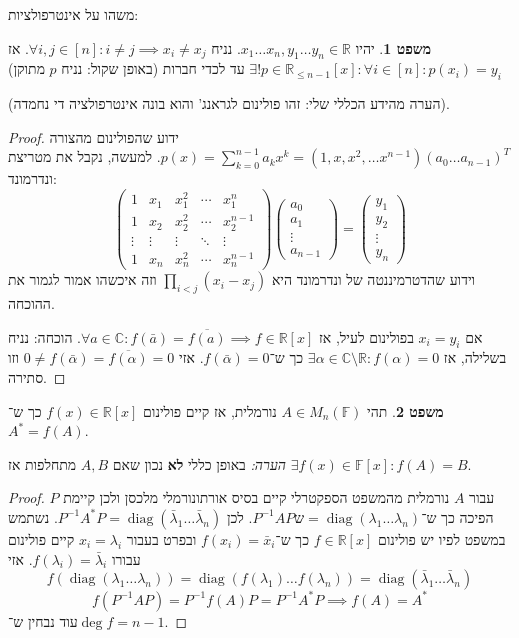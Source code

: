 \documentclass[a4paper]{article}
\newcommand\R     {\mathbb{R}}
\newcommand\C     {\mathbb{C}}
\newcommand\ol    {\overline}
\DeclareMathOperator{\diag}    {diag}
\newcommand\F         {\mathbb{F}}
\newcommand\co        {\colon}
\newcommand\pms[1]    {\begin{pmatrix}
		#1
\end{pmatrix}}
\newcommand\ag        {\alpha}
\renewcommand\lg      {\lambda}
\newcommand\op    {^{-1}}
\theoremstyle{definition}
\newtheorem{Theorem}{משפט}
\newcommand\theo  [1] {\begin{Theorem}#1\end{Theorem}}
\begin{document}
	משהו על אינטרפולציות: 
	\theo{יהיו $x_1 \dots x_n, y_1 \dots y_n \in \R$. נניח $\forall i, j \in [n] \co i \neq j \implies x_i \neq x_j$. אז $\exists! p \in \R_{\le n - 1}[x] \co \forall i \in [n] \co p(x_i) = y_i$ עד לכדי חברות (באופן שקול: נניח $p$ מתוקן) }
	(הערה מהידע הכללי שלי: זהו פולינום לגראנג' והוא בונה אינטרפולציה די נחמדה). \begin{proof}
		ידוע שהפולינום מהצורה $p(x)  = \sum_{k = 0}^{n - 1} a_k x^k  = (1, x, x^2, \dots x^{n - 1}) (a_0 \dots a_{n - 1})^T$. למעשה, נקבל את מטריצת ונדרמונד: 
		\[ \pms{1 & x_1 & x_1^2 & \cdots & x_1^n \\ 1 & x_2 & x_2^2 & \cdots & x_2^{n - 1} \\ \vdots & \vdots & \vdots & \ddots & \vdots \\ 1 & x_n & x_n^2 & \cdots & x_n^{n - 1}}\pms{a_0 \\ a_1 \\ \vdots \\ a_{n - 1}} = \pms{y_1 \\ y_2 \\ \vdots \\ y_n} \]
		וידוע שהדטרמיננטה של ונדרמונד היא $\prod_{i < j} (x_i - x_j)$ וזה איכשהו אמור לגמור את ההוכחה. 
		
		אם $x_i = y_i$ בפולינום לעיל, אז $\forall a \in \C \co f(\bar a) = \ol{f(a)} \implies f \in \R[x]$. הוכחה: נניח בשלילה, אז $\exists \ag \in \C\setminus \R \co f(\ag) = 0$ כך ש־$f(\bar \ag) = 0$. אזי $0 \neq f(\bar \ag) = \ol{f(\ag)}  = 0$ וזו סתירה. 
	\end{proof}
	
	\theo{תהי $A \in M_n(\F)$ נורמלית, אז קיים פולינום $f(x) \in \R[x]$ כך ש־$A^* = f(A)$. }
	\textit{הערה: }באופן כללי \textbf{לא} נכון שאם $A, B$ מתחלפות אז $\exists f(x) \in \F[x] \co f(A) = B$. 
	\begin{proof}
		עבור $A$ נורמלית מהמשפט הספקטרלי קיים בסיס אורתונורמלי מלכסן ולכן קיימת $P$ הפיכה כך ש־$P\op APש = \diag(\lg_1 \dots \lg_n)$. לכן $P\op A^* P = \diag(\bar \lg_1 \dots \bar \lg_n)$. נשתמש במשפט לפיו יש פולינום $f \in \R[x]$ כך ש־$f(x_i) = \bar x_i$ ובפרט בעבור $x_i = \lg_i$ קיים פולינום עבורו $f(\lg_i) = \bar \lg_i$. אזי 
		\[ f(\diag(\lg_1 \dots \lg_n)) = \diag(f(\lg_1) \dots f(\lg_n)) = \diag(\bar \lg_1 \dots \bar \lg_n) \]
		\[ f(P\op A P) = P\op f(A) P = P \op A^* P \implies f(A) = A^* \]
		עוד נבחין ש־$\deg f = n - 1$. 
	\end{proof}
	
\end{document}
